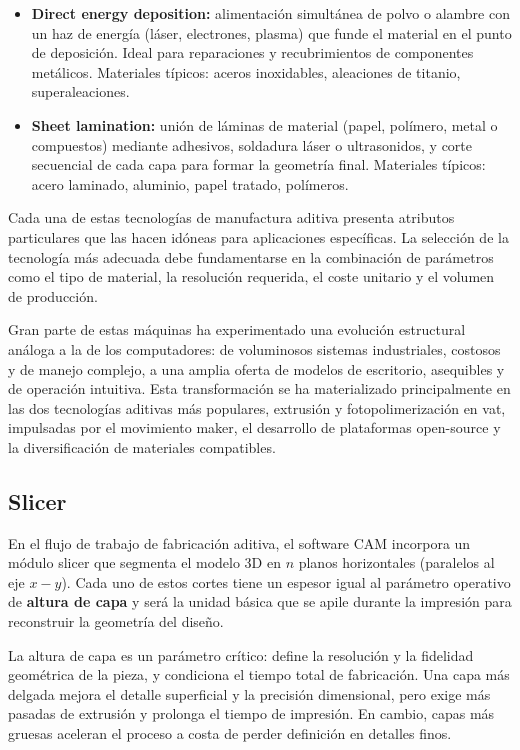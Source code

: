 \begin{itemize}
  \item \textbf{Direct energy deposition:}  
    alimentación simultánea de polvo o alambre con un haz de energía (láser, electrones, plasma) que funde el material en el punto de deposición. Ideal para reparaciones y recubrimientos de componentes metálicos. Materiales típicos: aceros inoxidables, aleaciones de titanio, superaleaciones.

  \item \textbf{Sheet lamination:}  
    unión de láminas de material (papel, polímero, metal o compuestos) mediante adhesivos, soldadura láser o ultrasonidos, y corte secuencial de cada capa para formar la geometría final. Materiales típicos: acero laminado, aluminio, papel tratado, polímeros.
\end{itemize}

Cada una de estas tecnologías de manufactura aditiva presenta atributos particulares que las hacen idóneas para aplicaciones específicas. La selección de la tecnología más adecuada debe fundamentarse en la combinación de parámetros como el tipo de material, la resolución requerida, el coste unitario y el volumen de producción.  

Gran parte de estas máquinas ha experimentado una evolución estructural análoga a la de los computadores: de voluminosos sistemas industriales, costosos y de manejo complejo, a una amplia oferta de modelos de escritorio, asequibles y de operación intuitiva. Esta transformación se ha materializado principalmente en las dos tecnologías aditivas más populares, extrusión y fotopolimerización en vat, impulsadas por el movimiento maker, el desarrollo de plataformas open-source y la diversificación de materiales compatibles.

\subsection{Slicer}

En el flujo de trabajo de fabricación aditiva, el software CAM incorpora un módulo slicer que segmenta el modelo 3D en $n$ planos horizontales (paralelos al eje $x-y$). Cada uno de estos cortes tiene un espesor igual al parámetro operativo de \textbf{altura de capa} y será la unidad básica que se apile durante la impresión para reconstruir la geometría del diseño.

La altura de capa es un parámetro crítico: define la resolución y la fidelidad geométrica de la pieza, y condiciona el tiempo total de fabricación. Una capa más delgada mejora el detalle superficial y la precisión dimensional, pero exige más pasadas de extrusión y prolonga el tiempo de impresión. En cambio, capas más gruesas aceleran el proceso a costa de perder definición en detalles finos.

